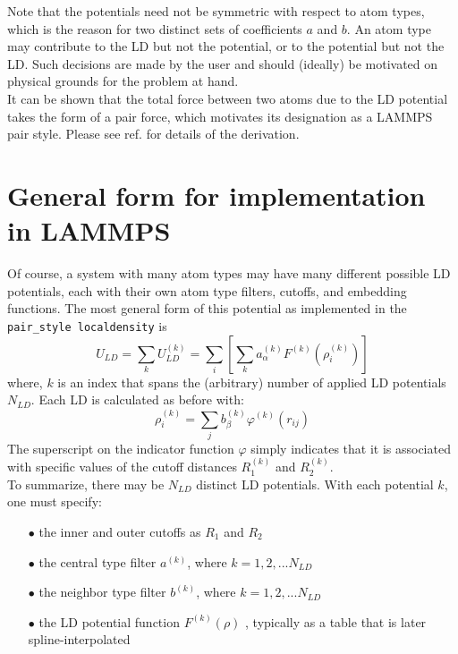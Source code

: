 \documentclass[12pt,a4paper]{article}
\begin{document}
\noindent Note that the potentials need not be symmetric with respect to atom types, which is the reason for two distinct sets of coefficients $a$ and $b$. An atom type may contribute to the LD but not the potential, or to the potential but not the LD. Such decisions are made by the user and should (ideally) be motivated on physical grounds for the problem at hand.\\

\noindent It can be shown that the total force between two atoms due to the LD potential takes the form of a pair force, which motivates its designation as a LAMMPS pair style. Please see ref. \cite{sanyal_2016} for details of the derivation. 
%
%
%
\section*{General form for implementation in LAMMPS}
Of course, a system with many atom types may have many different possible LD potentials, each with their own atom type filters, cutoffs, and embedding functions. The most general form of this potential as implemented in the \texttt{pair\_style localdensity} is
%
\begin{equation*}
U_{LD} = \sum_k U_{LD}^{(k)} = \sum_i \left[ \sum_k a_\alpha^{(k)} F^{(k)} \left(\rho_i^{(k)}\right) \right] 
\end{equation*}
%
where, $k$ is an index that spans the (arbitrary) number of applied LD potentials $N_{LD}$. Each LD is calculated as before with:
%
\begin{equation*}
\rho_i^{(k)} = \sum_j b_\beta^{(k)} \varphi^{(k)} (r_{ij})
\end{equation*}
%
The superscript on the indicator function $\varphi$ simply indicates that it is associated with specific values of the cutoff distances $R_1^{(k)}$ and $R_2^{(k)}$.\\

\noindent To summarize, there may be $N_{LD}$ distinct LD potentials.  With each potential $k$, one must specify:
%
\begin{itemize}
\item[$\bullet$] the inner and outer cutoffs as $R_1$ and $R_2$ 
\item[$\bullet$] the central type filter $a^{(k)}$, where $k = 1,2,...N_{LD}$
\item[$\bullet$] the neighbor type filter $b^{(k)}$, where $k = 1,2,...N_{LD}$
\item[$\bullet$] the LD potential function $F^{(k)}(\rho)$ , typically as a table that is later spline-interpolated
\end{itemize}
%
%
%
\end{document}

